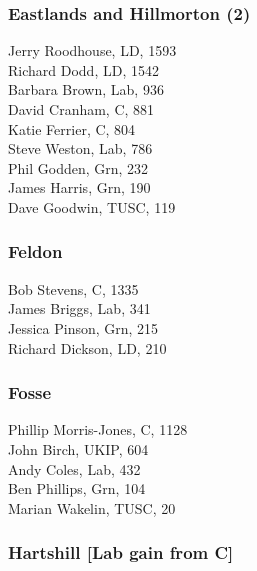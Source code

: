 \documentclass[a4paper,openany,10pt]{book}
\begin{document}
\subsubsection*{Eastlands and Hillmorton (2)}



Jerry Roodhouse, LD, 1593\\
Richard Dodd, LD, 1542\\
Barbara Brown, Lab, 936\\
David Cranham, C, 881\\
Katie Ferrier, C, 804\\
Steve Weston, Lab, 786\\
Phil Godden, Grn, 232\\
James Harris, Grn, 190\\
Dave Goodwin, TUSC, 119\\


\subsubsection*{Feldon}



Bob Stevens, C, 1335\\
James Briggs, Lab, 341\\
Jessica Pinson, Grn, 215\\
Richard Dickson, LD, 210\\


\subsubsection*{Fosse}



Phillip Morris-Jones, C, 1128\\
John Birch, UKIP, 604\\
Andy Coles, Lab, 432\\
Ben Phillips, Grn, 104\\
Marian Wakelin, TUSC, 20\\


\subsubsection*{Hartshill \hspace*{\fill}\nolinebreak[1]%
\enspace\hspace*{\fill}
[Lab gain from C]}
\end{document}
